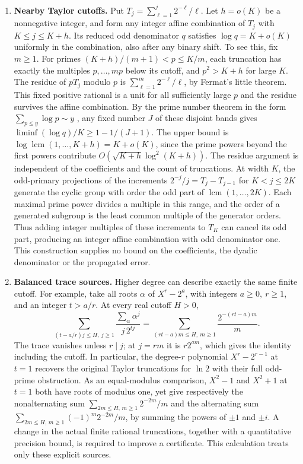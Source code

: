 \documentclass[11pt]{article}
\begin{document}
\begin{enumerate}[leftmargin=*,label=\textbf{\arabic*.}]
\item \textbf{Nearby Taylor cutoffs.}
Put \(T_j=\sum_{\ell=1}^j2^{-\ell}/\ell\). Let \(h=o(K)\) be a nonnegative integer, and form any integer affine combination of \(T_j\) with \(K\le j\le K+h\). Its reduced odd denominator \(q\) satisfies \(\log q=K+o(K)\) uniformly in the combination, also after any binary shift. To see this, fix \(m\ge1\). For primes \((K+h)/(m+1)<p\le K/m\), each truncation has exactly the multiples \(p,\ldots,mp\) below its cutoff, and \(p^2>K+h\) for large \(K\). The residue of \(pT_j\) modulo \(p\) is \(\sum_{\ell=1}^m2^{-\ell}/\ell\), by Fermat's little theorem. This fixed positive rational is a unit for all sufficiently large \(p\) and the residue survives the affine combination. By the prime number theorem in the form \(\sum_{p\le y}\log p\sim y\) \cite{hadamard}, any fixed number \(J\) of these disjoint bands gives \(\liminf(\log q)/K\ge 1-1/(J+1)\). The upper bound is \(\log\operatorname{lcm}(1,\ldots,K+h)=K+o(K)\), since the prime powers beyond the first powers contribute \(O(\sqrt{K+h}\log^2(K+h))\). The residue argument is independent of the coefficients and the count of truncations. At width \(K\), the odd-primary projections of the increments \(2^{-j}/j=T_j-T_{j-1}\) for \(K<j\le2K\) generate the cyclic group with order the odd part of \(\operatorname{lcm}(1,\ldots,2K)\). Each maximal prime power divides a multiple in this range, and the order of a generated subgroup is the least common multiple of the generator orders. Thus adding integer multiples of these increments to \(T_K\) can cancel its odd part, producing an integer affine combination with odd denominator one. This construction supplies no bound on the coefficients, the dyadic denominator or the propagated error.

\item \textbf{Balanced trace sources.}
Higher degree can describe exactly the same finite cutoff. For example, take all roots \(\alpha\) of \(X^r-2^a\), with integers \(a\ge0,\ r\ge1\), and an integer \(t>a/r\). At every real cutoff \(H>0\),
\[
 \sum_{(t-a/r)j\le H,\ j\ge1}\frac{\sum_\alpha\alpha^j}{j\,2^{tj}}
 =\sum_{(rt-a)m\le H,\ m\ge1}\frac{2^{-(rt-a)m}}m.
\]
The trace vanishes unless \(r\mid j\); at \(j=rm\) it is \(r2^{am}\), which gives the identity including the cutoff. In particular, the degree-\(r\) polynomial \(X^r-2^{r-1}\) at \(t=1\) recovers the original Taylor truncations for \(\ln 2\) with their full odd-prime obstruction. As an equal-modulus comparison, \(X^2-1\) and \(X^2+1\) at \(t=1\) both have roots of modulus one, yet give respectively the nonalternating sum \(\sum_{2m\le H,\,m\ge1}2^{-2m}/m\) and the alternating sum \(\sum_{2m\le H,\,m\ge1}(-1)^m 2^{-2m}/m\), by summing the powers of \(\pm1\) and \(\pm i\). A change in the actual finite rational truncations, together with a quantitative precision bound, is required to improve a certificate. This calculation treats only these explicit sources.


\end{enumerate}
\end{document}
